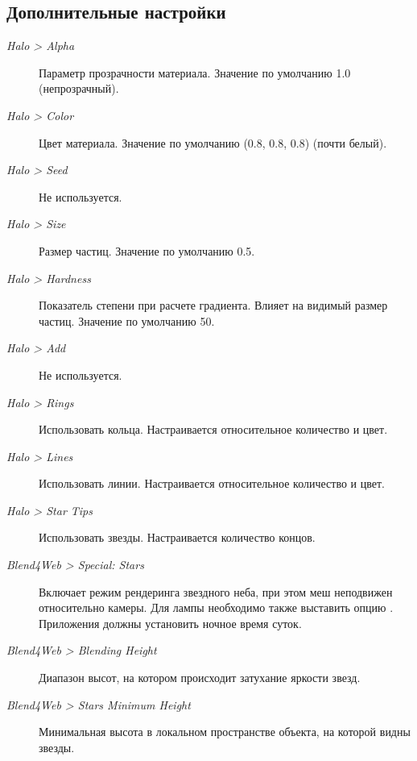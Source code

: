 \documentclass[a4paper,12pt,oneside]{sphinxmanual}
\begin{document}
\subsection{Дополнительные настройки}
\label{materials:id15}\begin{description}
\item[{\emph{Halo \textgreater{} Alpha}}] \leavevmode
Параметр прозрачности материала. Значение по умолчанию 1.0 (непрозрачный).

\item[{\emph{Halo \textgreater{} Color}}] \leavevmode
Цвет материала. Значение по умолчанию (0.8, 0.8, 0.8) (почти белый).

\item[{\emph{Halo \textgreater{} Seed}}] \leavevmode
Не используется.

\item[{\emph{Halo \textgreater{} Size}}] \leavevmode
Размер частиц. Значение по умолчанию 0.5.

\item[{\emph{Halo \textgreater{} Hardness}}] \leavevmode
Показатель степени при расчете градиента. Влияет на видимый размер частиц. Значение по умолчанию 50.

\item[{\emph{Halo \textgreater{} Add}}] \leavevmode
Не используется.

\item[{\emph{Halo \textgreater{} Rings}}] \leavevmode
Использовать кольца. Настраивается относительное количество и цвет.

\item[{\emph{Halo \textgreater{} Lines}}] \leavevmode
Использовать линии. Настраивается относительное количество и цвет.

\item[{\emph{Halo \textgreater{} Star Tips}}] \leavevmode
Использовать звезды. Настраивается количество концов.

\item[{\emph{Blend4Web \textgreater{} Special: Stars}}] \leavevmode
Включает режим рендеринга звездного неба, при этом меш неподвижен относительно камеры. Для лампы необходимо также выставить опцию . Приложения должны установить ночное время суток.

\item[{\emph{Blend4Web \textgreater{} Blending Height}}] \leavevmode
Диапазон высот, на котором происходит затухание яркости звезд.

\item[{\emph{Blend4Web \textgreater{} Stars Minimum Height}}] \leavevmode
Минимальная высота в локальном пространстве объекта, на которой видны звезды.

\end{description}
\label{node_materials:node-materials}
\end{document}
